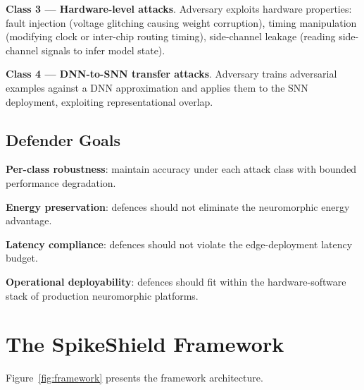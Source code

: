 \documentclass[sigconf,nonacm]{acmart}
\begin{document}
\textbf{Class 3 --- Hardware-level attacks}. Adversary exploits
hardware properties: fault injection (voltage glitching causing
weight corruption), timing manipulation (modifying clock or
inter-chip routing timing), side-channel leakage (reading
side-channel signals to infer model state).

\textbf{Class 4 --- DNN-to-SNN transfer attacks}. Adversary trains
adversarial examples against a DNN approximation and applies them
to the SNN deployment, exploiting representational overlap.

\subsection{Defender Goals}

\textbf{Per-class robustness}: maintain accuracy under each attack
class with bounded performance degradation.

\textbf{Energy preservation}: defences should not eliminate the
neuromorphic energy advantage.

\textbf{Latency compliance}: defences should not violate the
edge-deployment latency budget.

\textbf{Operational deployability}: defences should fit within the
hardware-software stack of production neuromorphic platforms.

\section{The SpikeShield Framework}

Figure~\ref{fig:framework} presents the framework architecture.
\end{document}
